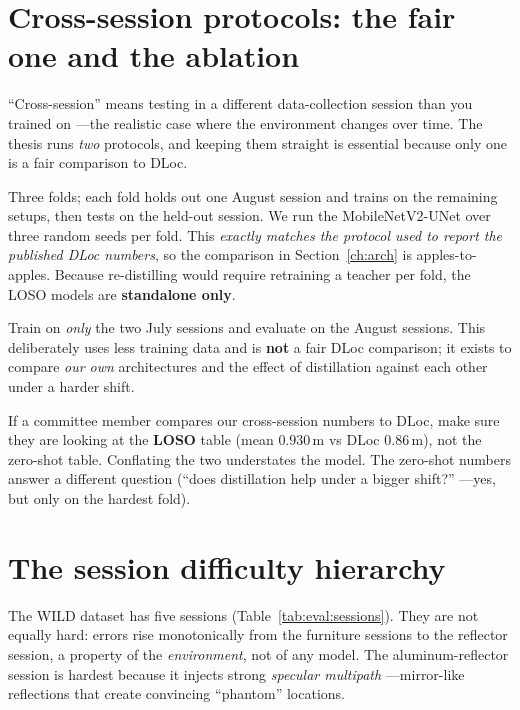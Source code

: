 \section{Cross-session protocols: the fair one and the ablation}
\label{sec:eval:crosssession}

``Cross-session'' means testing in a different data-collection session than you trained on ---the
realistic case where the environment changes over time. The thesis runs \emph{two} protocols, and
keeping them straight is essential because only one is a fair comparison to DLoc.

\begin{description}[leftmargin=1.6em,style=nextline,nosep]
  \item[Leave-one-session-out (LOSO) --- the fair comparison.] Three folds; each fold holds out one
  August session and trains on the remaining setups, then tests on the held-out session. We run the
  MobileNetV2-UNet over three random seeds per fold. This \emph{exactly matches the protocol used to
  report the published DLoc numbers}, so the comparison in Section~\ref{ch:arch} is apples-to-apples.
  Because re-distilling would require retraining a teacher per fold, the LOSO models are
  \textbf{standalone only}.
  \item[Zero-shot stress test --- an internal ablation.] Train on \emph{only} the two July sessions
  and evaluate on the August sessions. This deliberately uses less training data and is \textbf{not} a
  fair DLoc comparison; it exists to compare \emph{our own} architectures and the effect of
  distillation against each other under a harder shift.
\end{description}

\begin{defensetip}
If a committee member compares our cross-session numbers to DLoc, make sure they are looking at the
\textbf{LOSO} table (mean $0.930$\,m vs DLoc $0.86$\,m), not the zero-shot table. Conflating the two
understates the model. The zero-shot numbers answer a different question (``does distillation help
under a bigger shift?'' ---yes, but only on the hardest fold).
\end{defensetip}

\section{The session difficulty hierarchy}
\label{sec:eval:sessions}

The WILD dataset has five sessions (Table~\ref{tab:eval:sessions}). They are not equally hard: errors
rise monotonically from the furniture sessions to the reflector session, a property of the
\emph{environment}, not of any model. The aluminum-reflector session is hardest because it injects
strong \emph{specular multipath} ---mirror-like reflections that create convincing ``phantom''
locations.

